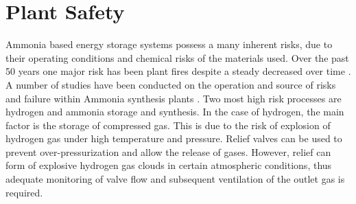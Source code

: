 







%

{\renewcommand{\arraystretch}{1.0}}
\section{Plant Safety}

Ammonia based energy storage systems possess a many inherent risks, due to their operating conditions and chemical risks of the materials used. Over the past 50 years one major risk has been plant fires despite a steady decreased over time \cite{Ojha2010}\cite{Williams1999}. A number of studies have been conducted on the operation and source of risks and failure within Ammonia synthesis plants \cite{Ojha2010}. Two most high risk processes are hydrogen and ammonia storage and synthesis. In the case of hydrogen, the main factor is the storage of compressed gas. This is due to the risk of explosion of hydrogen gas under high temperature and pressure. Relief valves can be used to prevent over-pressurization and allow the release of gases. However, relief can form of explosive hydrogen gas clouds in certain atmospheric conditions, thus adequate monitoring of valve flow and subsequent ventilation of the outlet gas is required. 



